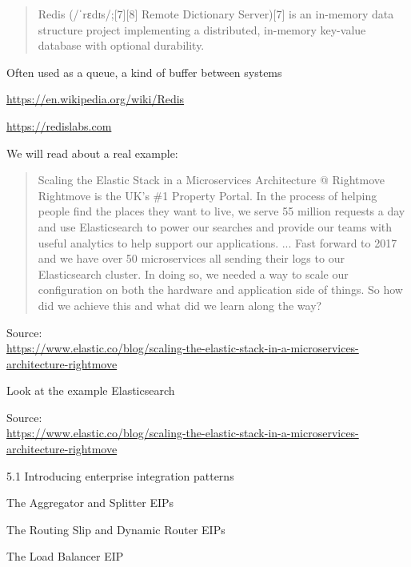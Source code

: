 \documentclass[Screen16to9,17pt]{foils}
\begin{document}
\begin{quote}
Redis (/ˈrɛdɪs/;[7][8] Remote Dictionary Server)[7] is an in-memory data structure
project implementing a distributed, in-memory key-value database with optional durability.
\end{quote}

\begin{list2}
\item Often used as a queue, a kind of buffer between systems
\item \url{https://en.wikipedia.org/wiki/Redis}
\item \url{https://redislabs.com}
\end{list2}



We will read about a real example:

\begin{quote}
Scaling the Elastic Stack in a Microservices Architecture @ Rightmove\\
Rightmove is the UK's \#1 Property Portal. In the process of helping people find the places they want to live, we serve 55 million requests a day and use Elasticsearch to power our searches and provide our teams with useful analytics to help support our applications.
...
Fast forward to 2017 and we have over 50 microservices all sending their logs to our Elasticsearch cluster. In doing so, we needed a way to scale our configuration on both the hardware and application side of things. So how did we achieve this and what did we learn along the way?
\end{quote}
Source:\\
{\footnotesize\url{https://www.elastic.co/blog/scaling-the-elastic-stack-in-a-microservices-architecture-rightmove}}


Look at the example Elasticsearch

Source:\\
{\footnotesize\url{https://www.elastic.co/blog/scaling-the-elastic-stack-in-a-microservices-architecture-rightmove}}







\begin{list2}
\item 5.1 Introducing enterprise integration patterns
\item The Aggregator and Splitter EIPs
\item The Routing Slip and Dynamic Router EIPs
\item The Load Balancer EIP
\end{list2}
\end{document}
